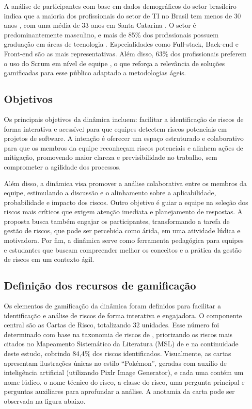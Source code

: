 \documentclass[12pt]{article}
\begin{document}
A análise de participantes com base em dados demográficos do setor brasileiro indica que a maioria dos profissionais do setor de TI no Brasil tem menos de 30 anos \cite{jetbrains2023dev}, com uma média de 33 anos em Santa Catarina \cite{acate}. O setor é predominantemente masculino, e mais de 85\% dos profissionais possuem graduação em áreas de tecnologia \cite{revelo2021tecnologia}. Especialidades como Full-stack, Back-end e Front-end são as mais representativas. Além disso, 63\% dos profissionais preferem o uso do Scrum em nível de equipe \cite{17_agile_report}, o que reforça a relevância de soluções gamificadas para esse público adaptado a metodologias ágeis.

\subsection{Objetivos}
Os principais objetivos da dinâmica incluem: facilitar a identificação de riscos de forma interativa e acessível para que equipes detectem riscos potenciais em projetos de software. A intenção é oferecer um espaço estruturado e colaborativo para que os membros da equipe reconheçam riscos potenciais e alinhem ações de mitigação, promovendo maior clareza e previsibilidade no trabalho, sem comprometer a agilidade dos processos.

Além disso, a dinâmica visa promover a análise colaborativa entre os membros da equipe, estimulando a discussão e o alinhamento sobre a aplicabilidade, probabilidade e impacto dos riscos. Outro objetivo é guiar a equipe na seleção dos riscos mais críticos que exigem atenção imediata e planejamento de respostas. A proposta busca também engajar os participantes, transformando a tarefa de gestão de riscos, que pode ser percebida como árida, em uma atividade lúdica e motivadora. Por fim, a dinâmica serve como ferramenta pedagógica para equipes e estudantes que buscam compreender melhor os conceitos e a prática da gestão de riscos em um contexto ágil.

\subsection{Definição dos recursos de gamificação}
Os elementos de gamificação da dinâmica foram definidos para facilitar a identificação e análise de riscos de forma interativa e engajadora. O componente central são as Cartas de Risco, totalizando 32 unidades. Esse número foi determinado com base na taxonomia de riscos de \cite{carr_1993}, priorizando os riscos mais citados no Mapeamento Sistemático da Literatura (MSL) de \cite{garcia2023agreed} e na continuidade deste estudo, cobrindo 84,4\% dos riscos identificados. Visualmente, as cartas apresentam ilustrações únicas no estilo “Pokémon”, geradas com auxílio de inteligência artificial (utilizando Pixlr Image Generator), e cada uma contém um nome lúdico, o nome técnico do risco, a classe do risco, uma pergunta principal e perguntas auxiliares para aprofundar a análise. A anotamia da carta pode ser observada na figura abaixo.
\end{document}
